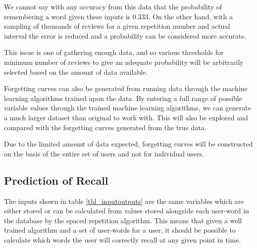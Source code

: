 We cannot say with any accuracy from this data that the probability of remembering a word
given these inputs is 0.333. On the other hand, with a sampling of thousands of reviews for a
given repetition number and actual interval the error is reduced and a probability can
be considered more accurate. %

This issue is one of gathering enough data, and so various thresholds for minimum number of reviews
to give an adequate probability will be arbitrarily selected based on the amount of data available.

Forgetting curves can also be generated from running data through the machine learning
algorithms trained upon the data. By entering a full range of possible variable values through
the trained machine learning algorithms, we can generate a much larger dataset than original
to work with. This will also be explored and compared with the forgetting curves generated from
the true data.

Due to the limited amount of data expected, forgetting curves will be constructed on the basis of
the entire set of users and not for individual users.

\subsection{Prediction of Recall}

The inputs shown in table \ref{tbl_inputoutputs} are the same variables which are
either stored or can be calculated from values stored alongside each user-word in
the database by the spaced repetition algorithm. This means that given a well
trained algorithm and a set of user-words for a user, it should be possible to
calculate which words the user will correctly recall at any given point in time.



